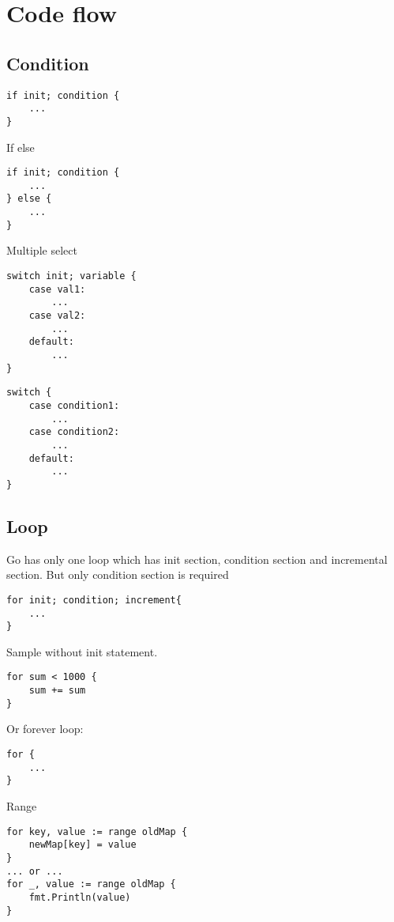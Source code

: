 \documentclass[12pt]{article}
\begin{document}
\section{Code flow}
\label{sec:code-flow}

\subsection{Condition}
\begin{lstlisting}
if init; condition {
    ...
}
\end{lstlisting}

If else
\begin{lstlisting}
if init; condition {
    ...
} else {
    ...
}
\end{lstlisting}

Multiple select
\begin{lstlisting}
switch init; variable {
    case val1:
        ...
    case val2:
        ...
    default:
        ...
}
\end{lstlisting}

\begin{lstlisting}
switch {
    case condition1:
        ...
    case condition2:
        ...
    default:
        ...
}
\end{lstlisting}



\subsection{Loop}
\label{subsec:loop}
Go has only one loop which has init section, condition section and incremental section.
But only condition section is required

\begin{lstlisting}
for init; condition; increment{
    ...
}
\end{lstlisting}

Sample without init statement.
\begin{lstlisting}
for sum < 1000 {
    sum += sum
}
\end{lstlisting}

Or forever loop:
\begin{lstlisting}
for {
    ...
}
\end{lstlisting}

Range
\begin{lstlisting}
for key, value := range oldMap {
    newMap[key] = value
}
... or ...
for _, value := range oldMap {
    fmt.Println(value)
}
\end{lstlisting}
\end{document}
